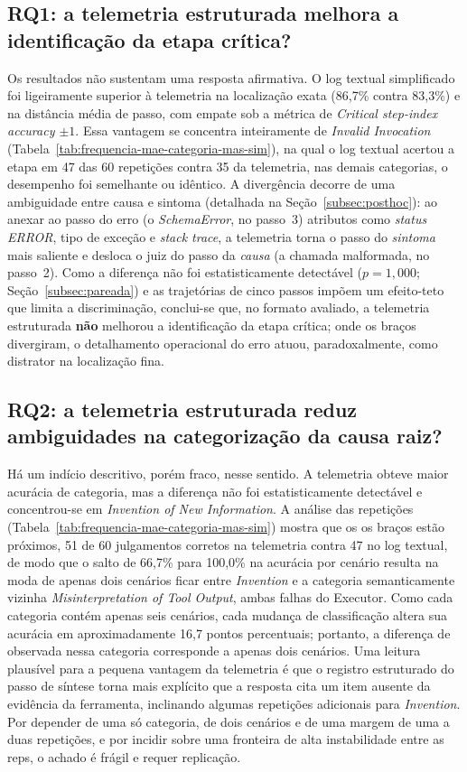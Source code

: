 \documentclass[sigconf]{acmart}
\begin{document}
\subsection{RQ1: a telemetria estruturada melhora a identificação da etapa crítica?}

Os resultados não sustentam uma resposta afirmativa. O log textual simplificado foi ligeiramente superior à telemetria
na localização exata (86,7\% contra 83,3\%) e na distância média de passo, com empate sob a métrica de \textit{Critical
	step-index accuracy $\pm 1$}. Essa vantagem se concentra inteiramente de \textit{Invalid Invocation}
(Tabela~\ref{tab:frequencia-mae-categoria-mas-sim}), na qual o log textual acertou a etapa em 47 das 60 repetições
contra 35 da telemetria, nas demais categorias, o desempenho foi semelhante ou idêntico. A divergência decorre de uma
ambiguidade entre causa e sintoma (detalhada na Seção~\ref{subsec:posthoc}): ao anexar ao passo do erro (o
\textit{SchemaError}, no passo~3) atributos como \textit{status} \textit{ERROR}, tipo de exceção e \textit{stack
	trace}, a telemetria torna o passo do \textit{sintoma} mais saliente e desloca o juiz do passo da \textit{causa} (a
chamada malformada, no passo~2). Como a diferença não foi estatisticamente detectável ($p = 1{,}000$;
Seção~\ref{subsec:pareada}) e as trajetórias de cinco passos impõem um efeito-teto que limita a discriminação,
conclui-se que, no formato avaliado, a telemetria estruturada \textbf{não} melhorou a identificação da etapa crítica;
onde os braços divergiram, o detalhamento operacional do erro atuou, paradoxalmente, como distrator na localização
fina.

\subsection{RQ2: a telemetria estruturada reduz ambiguidades na categorização da causa raiz?}

Há um indício descritivo, porém fraco, nesse sentido. A telemetria obteve maior acurácia de categoria, mas a diferença
não foi estatisticamente detectável e concentrou-se em \textit{Invention of New Information}. A análise das repetições
(Tabela~\ref{tab:frequencia-mae-categoria-mas-sim}) mostra que os os braços estão próximos, 51 de 60 julgamentos
corretos na telemetria contra 47 no log textual, de modo que o salto de 66,7\% para 100,0\% na acurácia por cenário
resulta na moda de apenas dois cenários ficar entre \textit{Invention} e a categoria semanticamente vizinha
\textit{Misinterpretation of Tool Output}, ambas falhas do Executor. Como cada categoria contém apenas seis cenários,
cada mudança de classificação altera sua acurácia em aproximadamente 16,7 pontos percentuais; portanto, a diferença de
observada nessa categoria corresponde a apenas dois cenários. Uma leitura plausível para a pequena vantagem da
telemetria é que o registro estruturado do passo de síntese torna mais explícito que a resposta cita um item ausente da
evidência da ferramenta, inclinando algumas repetições adicionais para \textit{Invention}. Por depender de uma só
categoria, de dois cenários e de uma margem de uma a duas repetições, e por incidir sobre uma fronteira de alta
instabilidade entre as reps, o achado é frágil e requer replicação.
\end{document}
